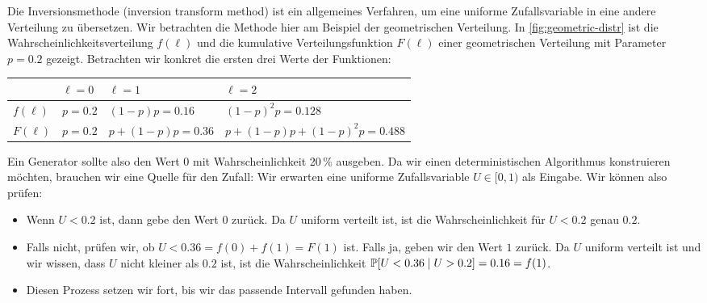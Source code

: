 Die  Inversionsmethode (inversion transform method) ist ein allgemeines Verfahren, um eine uniforme Zufallsvariable in eine andere Verteilung zu übersetzen.
Wir betrachten die Methode hier am Beispiel der geometrischen Verteilung.
In \cref{fig:geometric-distr} ist die Wahrscheinlichkeitsverteilung $f(\ell)$ und die kumulative Verteilungsfunktion $F(\ell)$ einer geometrischen Verteilung mit Parameter $p = 0.2$ gezeigt.
%
Betrachten wir konkret die ersten drei Werte der Funktionen:

\begin{center}
    \begin{tabular}{l|p{}p{}p{}}
                  & $\ell = 0$ & $\ell = 1$              & $\ell = 2$                              \\\hline\hline
        $f(\ell)$ & $p =0.2$   & $(1 {-} p)p = 0.16$     & $(1 {-} p)^2p = 0.128$                  \\
        $F(\ell)$ & $p =0.2$   & $p{+}(1 {-} p)p = 0.36$ & $p{+}(1 {-} p)p{+}(1 {-} p)^2p = 0.488$
    \end{tabular}
\end{center}
\vspace{1em}

Ein Generator sollte also \zB den Wert $0$ mit Wahrscheinlichkeit 20\,\% ausgeben.
Da wir einen deterministischen Algorithmus konstruieren möchten, brauchen wir eine Quelle für den Zufall:
Wir erwarten eine uniforme Zufallsvariable $U \in [0, 1)$ als Eingabe.
Wir können also \zB prüfen:
\begin{itemize}
    \item Wenn $U < 0.2$ ist, dann gebe den Wert $0$ zurück.
          Da $U$ uniform verteilt ist, ist die Wahrscheinlichkeit für $U < 0.2$ genau $0.2$.

    \item Falls nicht, prüfen wir, ob $U < 0.36 = f(0) + f(1) = F(1)$ ist. Falls ja, geben wir den Wert $1$ zurück.
          Da $U$ uniform verteilt ist und wir wissen, dass $U$ nicht kleiner als $0.2$ ist, ist die Wahrscheinlichkeit $\mathbb{P}\!\left[U < 0.36 \mid U > 0.2\right] = 0.16 = f(1)$.

    \item Diesen Prozess setzen wir fort, bis wir das passende Intervall gefunden haben.
\end{itemize}

